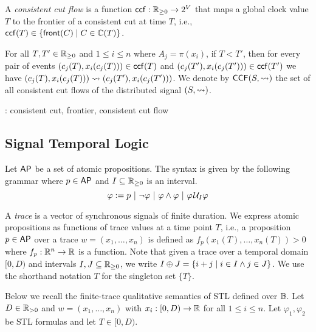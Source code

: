\begin{definition}
A \emph{consistent cut flow} is a function $\mathsf{ccf} : \mathbb{R}_{\geq 0} \to 2^V$ that 
maps a global clock value $T$ to the frontier of a consistent cut at time 
$T$, i.e., $\ccf(T) \in \{\fr(C) \st C \in \CC(T)\}$.
\end{definition}


For all $T,T' \in \mathbb{R}_{\geq 0}$ and $1 \leq i \leq n$ where $A_j = \pi(x_i)$, if 
$T < T'$, then for every pair of events $(c_j(T), x_i(c_j(T))) \in \mathsf{ccf}(T)$ and 
$(c_j(T'), x_i(c_j(T'))) \in \mathsf{ccf}(T')$ we have $(c_j(T), x_i(c_j(T))) \rightsquigarrow (c_j(T'), 
x_i(c_j(T')))$.
We denote by $\mathsf{CCF}(S,{\rightsquigarrow})$ the set of all consistent cut flows of the distributed signal $(S,{\rightsquigarrow})$.

\begin{example}
	\TODO: consistent cut, frontier, consistent cut flow
\end{example}


\subsection{Signal Temporal Logic} \label{sec:stl}
Let $\mathsf{AP}$ be a set of atomic propositions.
The syntax is given by the following grammar where $p \in \mathsf{AP}$ and $I \subseteq \mathbb{R}_{\geq 0}$ is an interval.
$$ \varphi :=  p ~|~ \lnot \varphi ~|~ \varphi \land \varphi ~|~ \varphi \kern.1em\mathcal{U}_I \varphi$$

A \emph{trace} is a vector of synchronous signals of finite duration.
We express atomic propositions as functions of trace values at a time point 
$T$, i.e., a proposition $p \in \mathsf{AP}$ over a trace $w = (x_1, \ldots, x_n)$ is 
defined as $f_p(x_1(T), \ldots, x_n(T)) > 0$ where $f_p : \mathbb{R}^n \to \mathbb{R}$ is a 
function.
Note that given a trace over a temporal domain $[0,D)$ and intervals $I,J \subseteq \mathbb{R}_{\geq 0}$, we write $I \oplus J = \{i + j \st i \in I \land j \in J\}$.
We use the shorthand notation $T$ for the singleton set $\{T\}$. 

Below we recall the finite-trace qualitative semantics of STL defined over $\mathbb{B}$.
Let $D \in \mathbb{R}_{> 0}$ and $w = (x_1, \ldots, x_n)$ with $x_i : [0,D) \to \mathbb{R}$ for all $1 \leq i \leq n$.
Let $\varphi_1, \varphi_2$ be STL formulas and let $T \in [0,D)$.

